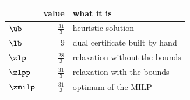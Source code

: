 \begin{center}\small
\begin{tabular}{lrl}
\toprule
 & value & what it is \\
\midrule
$\ub$ & $\frac{31}{3}$ & heuristic solution \\
$\lb$ & $9$ & dual certificate built by hand \\
$\zlp$ & $\frac{28}{3}$ & relaxation without the bounds \\
$\zlpp$ & $\frac{31}{3}$ & relaxation with the bounds \\
$\zmilp$ & $\frac{31}{3}$ & optimum of the MILP \\
\bottomrule
\end{tabular}
\end{center}
